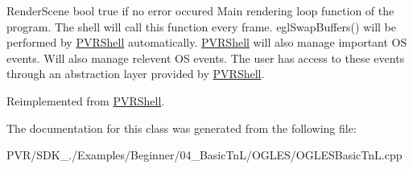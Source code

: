   Render\+Scene  bool true if no error occured  Main rendering loop function of the program. The shell will call this function every frame. egl\+Swap\+Buffers() will be performed by \hyperlink{class_p_v_r_shell}{P\+V\+R\+Shell} automatically. \hyperlink{class_p_v_r_shell}{P\+V\+R\+Shell} will also manage important O\+S events. Will also manage relevent O\+S events. The user has access to these events through an abstraction layer provided by \hyperlink{class_p_v_r_shell}{P\+V\+R\+Shell}. 

Reimplemented from \hyperlink{class_p_v_r_shell_ae0eb5f797cbe993a22b8659f9c332578}{P\+V\+R\+Shell}.



The documentation for this class was generated from the following file\+:\begin{DoxyCompactItemize}
\item 
P\+V\+R/\+S\+D\+K\+\_./\+Examples/\+Beginner/04\+\_\+\+Basic\+Tn\+L/\+O\+G\+L\+E\+S/O\+G\+L\+E\+S\+Basic\+Tn\+L.\+cpp\end{DoxyCompactItemize}
